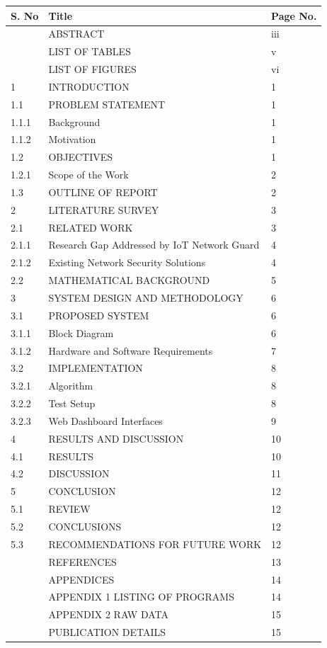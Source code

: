 \documentclass[11pt,a4paper]{report}
\begin{document}
\begin{center}
{\small
\begin{tabular}{|p{1.8cm}|p{11.2cm}|p{1.8cm}|}
\hline
\rowcolor{black!10}
\textbf{S. No} & \textbf{Title} & \textbf{Page No.} \\
\hline
& ABSTRACT & iii \\
\hline
& LIST OF TABLES & v \\
\hline
& LIST OF FIGURES & vi \\
\hline
1 & INTRODUCTION & 1 \\
1.1 & PROBLEM STATEMENT & 1 \\
1.1.1 & Background & 1 \\
1.1.2 & Motivation & 1 \\
1.2 & OBJECTIVES & 1 \\
1.2.1 & Scope of the Work & 2 \\
1.3 & OUTLINE OF REPORT & 2 \\
\hline
2 & LITERATURE SURVEY & 3 \\
2.1 & RELATED WORK & 3 \\
2.1.1 & Research Gap Addressed by IoT Network Guard & 4 \\
2.1.2 & Existing Network Security Solutions & 4 \\
2.2 & MATHEMATICAL BACKGROUND & 5 \\
\hline
3 & SYSTEM DESIGN AND METHODOLOGY & 6 \\
3.1 & PROPOSED SYSTEM & 6 \\
3.1.1 & Block Diagram & 6 \\
3.1.2 & Hardware and Software Requirements & 7 \\
3.2 & IMPLEMENTATION & 8 \\
3.2.1 & Algorithm & 8 \\
3.2.2 & Test Setup & 8 \\
3.2.3 & Web Dashboard Interfaces & 9 \\
\hline
4 & RESULTS AND DISCUSSION & 10 \\
4.1 & RESULTS & 10 \\
4.2 & DISCUSSION & 11 \\
\hline
5 & CONCLUSION & 12 \\
5.1 & REVIEW & 12 \\
5.2 & CONCLUSIONS & 12 \\
5.3 & RECOMMENDATIONS FOR FUTURE WORK & 12 \\
\hline
& REFERENCES & 13 \\
\hline
& APPENDICES & 14 \\
& APPENDIX 1 \quad LISTING OF PROGRAMS & 14 \\
& APPENDIX 2 \quad RAW DATA & 15 \\
\hline
& PUBLICATION DETAILS & 15 \\
\hline
\end{tabular}
}
\end{center}
\end{document}
